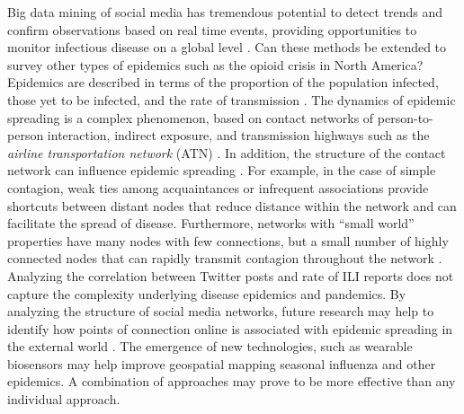 \documentclass[sigconf]{acmart}
\begin{document}
Big data mining of social media has tremendous potential to detect trends and confirm 
observations based on real time events, providing opportunities to monitor infectious 
disease on a global level \cite{hay13}. Can these methods be extended to survey other 
types of epidemics such as the opioid crisis in North America?\cite{smith16} Epidemics are 
described in terms of the proportion of the population infected, those yet to be infected, 
and the rate of transmission \cite{hethcote00}. The dynamics of epidemic spreading is a 
complex phenomenon, based on contact networks of person-to-person interaction, indirect 
exposure, and transmission highways such as the {\it airline transportation network} (ATN) 
\cite{Colizza06}. In addition, the structure of the contact network can influence epidemic 
spreading \cite{pastor01}. For example, in the case of simple contagion, weak ties among 
acquaintances or infrequent associations provide shortcuts between distant nodes that reduce 
distance within the network \cite{granovetter73} and can facilitate the spread of disease. 
Furthermore, networks with ``small world'' properties have many nodes with few connections, 
but a small number of highly connected nodes that can rapidly transmit contagion throughout 
the network \cite{watts98}. Analyzing the correlation between Twitter posts and rate of ILI 
reports does not capture the complexity underlying disease epidemics and pandemics. By 
analyzing the structure of social media networks, future research may help to identify how 
points of connection online is associated with epidemic spreading in the external world 
\cite{zhu17}. The emergence of new technologies, such as wearable biosensors 
\cite{carreiro15} may help improve geospatial mapping seasonal influenza and other epidemics.
A combination of approaches may prove to be more effective than any individual approach. 


 
\end{document}
